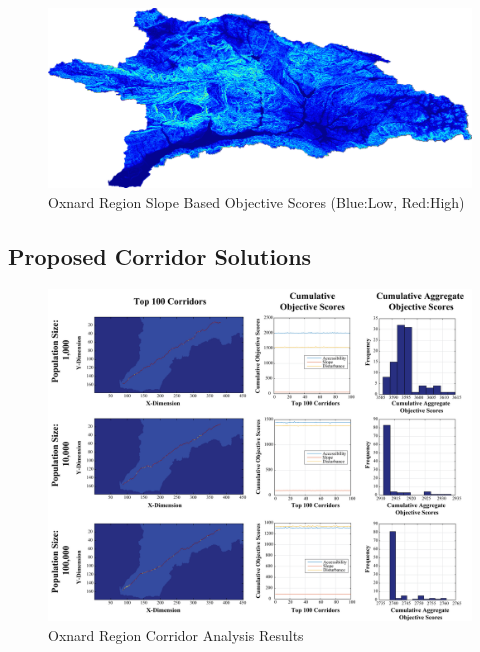         \begin{figure}[!h]
            \begin{center}
            \includegraphics[width=5.5in]{figures/Oxnard_SlopeScore.png}   
            \caption{Oxnard Region Slope Based Objective Scores (Blue:Low, Red:High)}
            \label{fig:Oslope}
            \end{center}
        \end{figure}
        
    \subsection{Proposed Corridor Solutions}
    
        \begin{figure}[!h]
            \begin{center}
            \includegraphics[width=6in]{figures/Oxnard_PathwayResults.png}   
            \caption{Oxnard Region Corridor Analysis Results}
            \label{fig:Oresults}
            \end{center}
        \end{figure}

